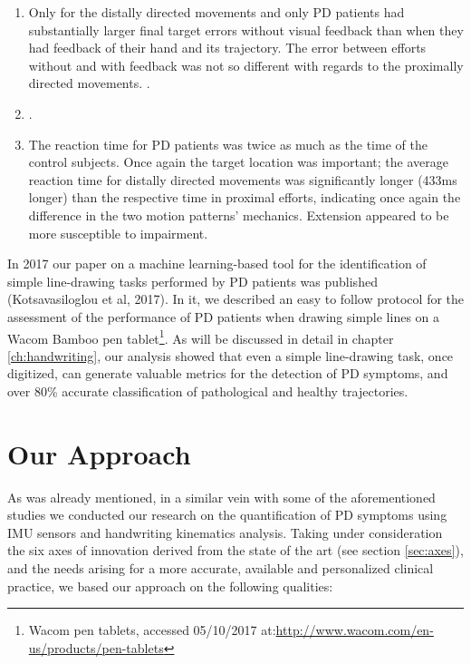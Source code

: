 \begin{enumerate}
\item Only for the distally directed movements and only \gls{PD} patients had substantially larger final target errors without visual feedback than when they had feedback of their hand and its trajectory. The error between efforts without and with feedback was not so different with regards to the proximally directed movements. . 
\item {}.
\item The reaction time for \gls{PD} patients was twice as much as the time of the control subjects. Once again the target location was important; the average reaction time for distally directed movements was significantly longer (433ms longer) than the respective time in proximal efforts, indicating once again the difference in the two motion patterns' mechanics. Extension appeared to be more susceptible to impairment.
\end{enumerate} 

In 2017 our paper on a machine learning-based tool for the identification of simple line-drawing tasks performed by PD patients was published (Kotsavasiloglou et al, 2017). In it, we described an easy to follow protocol for the assessment of the performance of PD patients when drawing simple lines on a Wacom Bamboo pen tablet\footnote{Wacom pen tablets, accessed 05/10/2017 at:\url{http://www.wacom.com/en-us/products/pen-tablets}}. As will be discussed in detail in chapter \ref{ch:handwriting}, our analysis showed that even a simple line-drawing task, once digitized, can generate valuable metrics for the detection of PD symptoms, and over 80\% accurate classification of pathological and healthy trajectories. 

\section{Our Approach}
\label{sec:ourApproach}
As was already mentioned, in a similar vein with some of the aforementioned studies we conducted our research on the quantification of \gls{PD} symptoms using \gls{IMU} sensors and handwriting kinematics analysis. 
Taking under consideration the six axes of innovation derived from the state of the art (see section \ref{sec:axes}), and the needs arising for a more accurate, available and personalized clinical practice, we based our approach on the following qualities:

